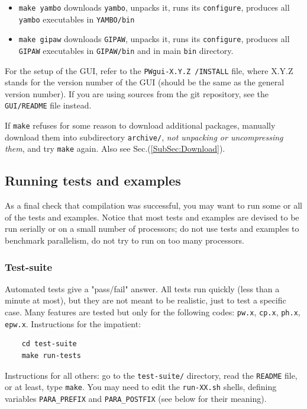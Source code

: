 \documentclass[12pt,a4paper]{article}
\def\pwx{\texttt{pw.x}}
\def\cpx{\texttt{cp.x}}
\def\phx{\texttt{ph.x}}
\def\epwx{\texttt{epw.x}}
\def\configure{\texttt{configure}}
\def\make{\texttt{make}}
\begin{document}
\begin{itemize}
	                 \configure,
                         produces all executables for \texttt{WanT} in
                         \texttt{WANT/bin}.
\item \texttt{make yambo} downloads \texttt{yambo},
			  unpacks it, runs its \configure,
                          produces all \texttt{yambo} executables in
                          \texttt{YAMBO/bin}
\item \texttt{make gipaw} downloads \texttt{GIPAW},
                          unpacks it, runs its \configure,
                          produces all \texttt{GIPAW} executables in
                          \texttt{GIPAW/bin} and in main \texttt{bin} directory.
\end{itemize}
For the setup of the GUI, refer to the \texttt{PWgui-X.Y.Z /INSTALL} file, where
X.Y.Z stands for the version number of the GUI (should be the same as the
general version number). If you are using sources from the git repository, see
the \texttt{GUI/README} file instead.

If \texttt{make} refuses for some reason to download additional
packages, manually download them into subdirectory
\texttt{archive/}, {\em not unpacking or uncompressing them},
and try \texttt{make} again. Also see Sec.(\ref{SubSec:Download}).

\subsection{Running tests and examples}
\label{SubSec:Examples}

As a final check that compilation was successful, you may want to run some or
all of the tests and examples. 
Notice that most tests and examples are devised to be run serially
or on a small number of processors; do not use tests and examples
to benchmark parallelism, do not try to run on too many processors.

\subsubsection{Test-suite}
Automated tests give a "pass/fail" answer. All tests run quickly 
(less than a minute at most), but they are not meant to be realistic, 
just to test a specific case. Many features are tested but only for
the following codes: \pwx, \cpx, \phx, \epwx.
Instructions for the impatient:
\begin{verbatim}
    cd test-suite
    make run-tests
\end{verbatim}
Instructions for all others: go to the \texttt{test-suite/} directory,
read the \texttt{README} file, or at least, type \make. You may need
to edit the \texttt{run-XX.sh} shells, defining variables
\texttt{PARA\_PREFIX} and \texttt{PARA\_POSTFIX} (see below for their
meaning).
\end{document}
